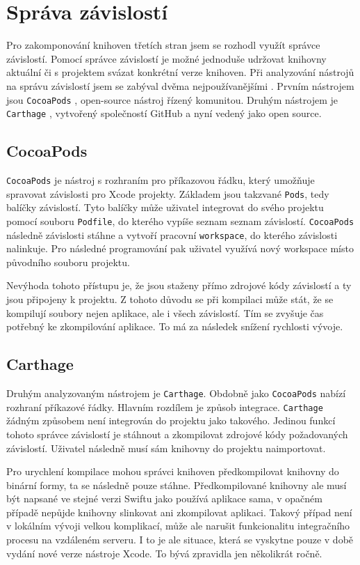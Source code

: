 \section{Správa závislostí}\label{analyza-sprava-zavislosti}

Pro zakomponování knihoven třetích stran jsem se rozhodl využít správce závislostí.
Pomocí správce závislostí je možné jednoduše udržovat knihovny aktuální či s projektem svázat konkrétní verze knihoven.
Při analyzování nástrojů na správu závislostí jsem se zabýval dvěma nejpoužívanějšími \cite{shashikantjagtap-swift-dependency-management}.
Prvním nástrojem jsou \texttt{CocoaPods} \cite{cocoapods-about}, open-source nástroj řízený komunitou.
Druhým nástrojem je \texttt{Carthage} \cite{github-carthage}, vytvořený společností GitHub a nyní vedený jako open source.

\subsection{CocoaPods}

\texttt{CocoaPods} je nástroj s rozhraním pro příkazovou řádku, který umožňuje spravovat závislosti pro Xcode projekty.
Základem jsou takzvané \texttt{Pods}, tedy balíčky závislostí.
Tyto balíčky může uživatel integrovat do svého projektu pomocí souboru \texttt{Podfile}, do kterého vypíše seznam seznam závislostí.
\texttt{CocoaPods} následně závislosti stáhne a vytvoří pracovní \texttt{workspace}, do kterého závislosti nalinkuje.
Pro následné programování pak uživatel využívá nový workspace místo původního souboru projektu.

Nevýhoda tohoto přístupu je, že jsou staženy přímo zdrojové kódy závislostí a ty jsou připojeny k projektu.
Z tohoto důvodu se při kompilaci může stát, že se kompilují soubory nejen aplikace, ale i všech závislostí.
Tím se zvyšuje čas potřebný ke zkompilování aplikace.
To má za následek snížení rychlosti vývoje.

\subsection{Carthage}

Druhým analyzovaným nástrojem je \texttt{Carthage}.
Obdobně jako \texttt{CocoaPods} nabízí rozhraní příkazové řádky.
Hlavním rozdílem je způsob integrace.
\texttt{Carthage} žádným způsobem není integrován do projektu jako takového.
Jedinou funkcí tohoto správce závislostí je stáhnout a zkompilovat zdrojové kódy požadovaných závislostí.
Uživatel následně musí sám knihovny do projektu naimportovat.

Pro urychlení kompilace mohou správci knihoven předkompilovat knihovny do binární formy, ta se následně pouze stáhne.
Předkompilované knihovny ale musí být napsané ve stejné verzi Swiftu jako používá aplikace sama, v opačném případě nepůjde knihovny slinkovat ani zkompilovat aplikaci.
Takový případ není v lokálním vývoji velkou komplikací, může ale narušit funkcionalitu integračního procesu na vzdáleném serveru.
I to je ale situace, která se vyskytne pouze v době vydání nové verze nástroje Xcode.
To bývá zpravidla jen několikrát ročně.
